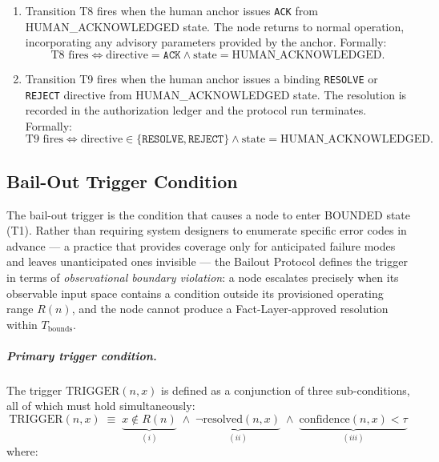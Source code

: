 \begin{enumerate}
\item[\textbf{T8: HUMAN\_ACKNOWLEDGED $\rightarrow$ IDLE (continue).}] Transition T8 fires when the human anchor issues \texttt{ACK} from HUMAN\_ACKNOWLEDGED state. The node returns to normal operation, incorporating any advisory parameters provided by the anchor. Formally:
\begin{equation}
\text{T8 fires} \iff \text{directive} = \texttt{ACK} \land \text{state} = \text{HUMAN\_ACKNOWLEDGED}. \tag{T8}
\end{equation}

\item[\textbf{T9: HUMAN\_ACKNOWLEDGED $\rightarrow$ RESOLVED (binding resolution from acknowledgment).}] Transition T9 fires when the human anchor issues a binding \texttt{RESOLVE} or \texttt{REJECT} directive from HUMAN\_ACKNOWLEDGED state. The resolution is recorded in the authorization ledger and the protocol run terminates. Formally:
\begin{equation}
\text{T9 fires} \iff \text{directive} \in \{\texttt{RESOLVE}, \texttt{REJECT}\} \land \text{state} = \text{HUMAN\_ACKNOWLEDGED}. \tag{T9}
\end{equation}
\end{enumerate}

\subsection{Bail-Out Trigger Condition}\label{sec:bailout-trigger}

The bail-out trigger is the condition that causes a node to enter BOUNDED state (T1). Rather than requiring system designers to enumerate specific error codes in advance — a practice that provides coverage only for anticipated failure modes and leaves unanticipated ones invisible — the Bailout Protocol defines the trigger in terms of \emph{observational boundary violation}: a node escalates precisely when its observable input space contains a condition outside its provisioned operating range $R(n)$, and the node cannot produce a Fact-Layer-approved resolution within $T_{\text{bounds}}$.

\subparagraph{Primary trigger condition.} The trigger $\text{TRIGGER}(n, x)$ is defined as a conjunction of three sub-conditions, all of which must hold simultaneously:
\begin{equation}
\text{TRIGGER}(n, x) \;\equiv\; \underbrace{x \notin R(n)}_{(i)} \;\land\; \underbrace{\neg\text{resolved}(n, x)}_{(ii)} \;\land\; \underbrace{\text{confidence}(n, x) < \tau}_{(iii)} \tag{TC}\label{eq:trigger-condition}
\end{equation}
where:

